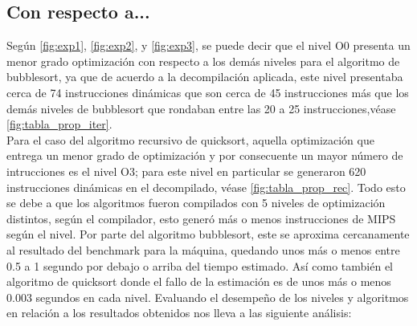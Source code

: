 \documentclass{memoria}
\begin{document}
\subsection{Con respecto a...}
Según  \ref{fig:exp1}, \ref{fig:exp2}, y \ref{fig:exp3}, se puede decir que el nivel O0 presenta un menor grado optimización con respecto a los demás niveles para el algoritmo de bubblesort, ya que de acuerdo a la decompilación aplicada, este nivel presentaba cerca de 74 instrucciones dinámicas que son cerca de 45 instrucciones más que los demás niveles de bubblesort que rondaban entre las 20 a 25 instrucciones,véase \ref{fig:tabla_prop_iter}.\\
Para el caso del algoritmo recursivo de quicksort, aquella optimización que entrega un menor grado de optimización y por consecuente un mayor número de intrucciones es el nivel O3; para este nivel en particular se generaron 620 instrucciones dinámicas en el decompilado, véase \ref{fig:tabla_prop_rec}.
Todo esto se debe a que los algoritmos fueron compilados con 5 niveles de optimización  distintos, según el compilador, esto generó más o menos instrucciones de MIPS según el nivel.
Por parte del algoritmo bubblesort, este se aproxima cercanamente al resultado del benchmark para la máquina, quedando unos más o menos entre 0.5 a 1 segundo por debajo o arriba del tiempo estimado. Así como también el algoritmo de quicksort donde el fallo de la estimación es de unos más o menos 0.003 segundos en cada nivel.
Evaluando el desempeño de los niveles y algoritmos en relación a los resultados obtenidos nos lleva a las siguiente análisis:
\end{document}
